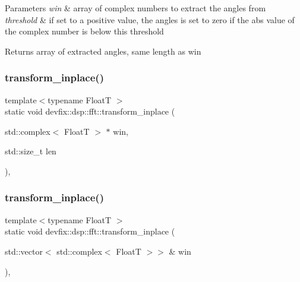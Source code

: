 \begin{DoxyParams}{Parameters}
{\em win} & array of complex numbers to extract the angles from \\
\hline
{\em threshold} & if set to a positive value, the angles is set to zero if the abs value of the complex number is below this threshold \\
\hline
\end{DoxyParams}
\begin{DoxyReturn}{Returns}
array of extracted angles, same length as win 
\end{DoxyReturn}
\mbox{\label{structdevfix_1_1dsp_1_1fft_af0c91dff74868f580ad295448e50693f}} 
\subsubsection{\texorpdfstring{transform\+\_\+inplace()}{transform\_inplace()}\hspace{0.1cm}{\footnotesize\ttfamily [1/3]}}
{\footnotesize\ttfamily template$<$typename FloatT $>$ \\
static void devfix\+::dsp\+::fft\+::transform\+\_\+inplace (\begin{DoxyParamCaption}\item[{std\+::complex$<$ FloatT $>$ $\ast$}]{win,  }\item[{std\+::size\+\_\+t}]{len }\end{DoxyParamCaption})\hspace{0.3cm}{\ttfamily [inline]}, {\ttfamily [static]}}

\mbox{\label{structdevfix_1_1dsp_1_1fft_ae3d7d5529ffad8aa929c5353252df7f5}} 
\subsubsection{\texorpdfstring{transform\+\_\+inplace()}{transform\_inplace()}\hspace{0.1cm}{\footnotesize\ttfamily [2/3]}}
{\footnotesize\ttfamily template$<$typename FloatT $>$ \\
static void devfix\+::dsp\+::fft\+::transform\+\_\+inplace (\begin{DoxyParamCaption}\item[{std\+::vector$<$ std\+::complex$<$ FloatT $>$$>$ \&}]{win }\end{DoxyParamCaption})\hspace{0.3cm}{\ttfamily [inline]}, {\ttfamily [static]}}

